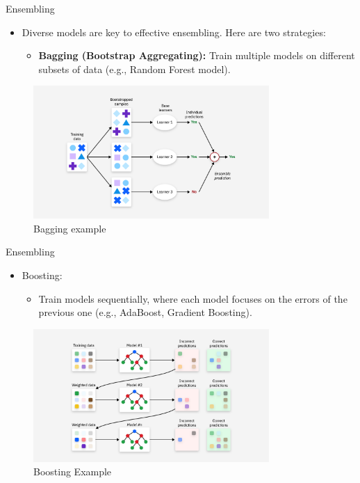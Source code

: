 \begin{frame}{Ensembling}
\begin{itemize}
    \item Diverse models are key to effective ensembling. Here are two strategies:
    \begin{itemize}
        \item \textbf{Bagging (Bootstrap Aggregating):} Train multiple models on different subsets of data (e.g., Random Forest model).
    \end{itemize}
    \end{itemize}
    \begin{figure}
    \centering
    \includegraphics[width=0.8\textwidth,height=0.8\textheight,keepaspectratio]{images/bagging.png}
    \caption{Bagging example}
\end{figure}
\end{frame}

\begin{frame}{Ensembling}
\begin{itemize}
    \item Boosting:
    \begin{itemize}
        \item Train models sequentially, where each model focuses on the errors of the previous one (e.g., AdaBoost, Gradient Boosting).
    \end{itemize}
\end{itemize}
\begin{figure}
    \centering
    \includegraphics[width=0.8\textwidth,height=0.8\textheight,keepaspectratio]{images/boosting.png}
    \caption{Boosting Example}
\end{figure}
\end{frame}

